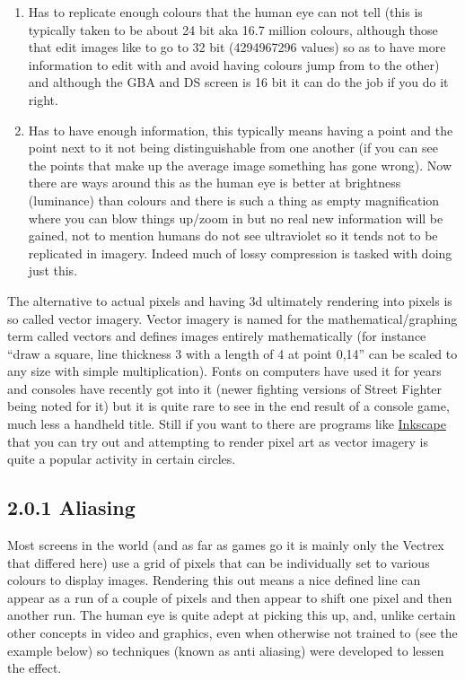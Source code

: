 \documentclass[
]{book}
\providecommand{\tightlist}{%
  \setlength{\itemsep}{0pt}\setlength{\parskip}{0pt}}
\begin{document}
\begin{enumerate}
\def\labelenumi{\arabic{enumi}.}
\tightlist
\item
  Has to replicate enough colours that the human eye can not tell (this is typically taken to be about 24 bit aka 16.7 million colours, although those that edit images like to go to 32 bit (4294967296 values) so as to have more information to edit with and avoid having colours jump from to the other) and although the GBA and DS screen is 16 bit it can do the job if you do it right.
\item
  Has to have enough information, this typically means having a point and the point next to it not being distinguishable from one another (if you can see the points that make up the average image something has gone wrong). Now there are ways around this as the human eye is better at brightness (luminance) than colours and there is such a thing as empty magnification where you can blow things up/zoom in but no real new information will be gained, not to mention humans do not see ultraviolet so it tends not to be replicated in imagery. Indeed much of lossy compression is tasked with doing just this.
\end{enumerate}

The alternative to actual pixels and having 3d ultimately rendering into pixels is so called vector imagery. Vector imagery is named for the mathematical/graphing term called vectors and defines images entirely mathematically (for instance ``draw a square, line thickness 3 with a length of 4 at point 0,14'' can be scaled to any size with simple multiplication). Fonts on computers have used it for years and consoles have recently got into it (newer fighting versions of Street Fighter being noted for it) but it is quite rare to see in the end result of a console game, much less a handheld title. Still if you want to there are programs like \href{http://inkscape.org/}{Inkscape} that you can try out and attempting to render pixel art as vector imagery is quite a popular activity in certain circles.

\hypertarget{aliasing}{%
\subsection{2.0.1 Aliasing}\label{aliasing}}

Most screens in the world (and as far as games go it is mainly only the Vectrex that differed here) use a grid of pixels that can be individually set to various colours to display images. Rendering this out means a nice defined line can appear as a run of a couple of pixels and then appear to shift one pixel and then another run. The human eye is quite adept at picking this up, and, unlike certain other concepts in video and graphics, even when otherwise not trained to (see the example below) so techniques (known as anti aliasing) were developed to lessen the effect.
\end{document}
